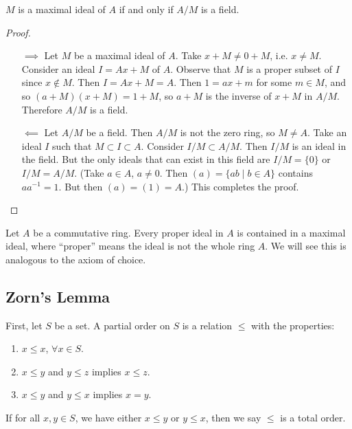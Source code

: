 \begin{prop}
$M$ is a maximal ideal of $A$ if and only if $A / M$ is a field.
\end{prop}

\begin{proof}
\begin{itemize}
  \item[$\implies$]
  {
    Let $M$ be a maximal ideal of $A$. Take $x + M \neq 0 + M$,
    i.e. $x \neq M$. Consider an ideal $I = A x + M$ of $A$. Observe
    that $M$ is a proper subset of $I$ since $x \notin M$. Then
    $I = Ax + M = A$. Then $1 = a x + m$ for some $m \in M$, and so
    $(a + M)(x + M) = 1 + M$, so $a + M$ is the inverse of $x + M$ in
    $A / M$. Therefore $A / M$ is a field.
  }
  \item[$\impliedby$]
  {
    Let $A / M$ be a field. Then $A / M$ is not the zero ring, so
    $M \neq A$. Take an ideal $I$ such that $M \subset I \subset
    A$. Consider $I / M \subset A / M$. Then $I / M$ is an ideal in
    the field. But the only ideals that can exist in this field
    are $I / M = \{ 0 \}$ or $I / M = A / M$. (Take $a \in A$,
    $a \neq 0$. Then $(a) = \{ ab \mid b \in A \}$ contains $a a^{-1}
    = 1$. But then $(a) = (1) = A$.) This completes the proof.
  }
\end{itemize}
\end{proof}

\begin{theorem}[?]
Let $A$ be a commutative ring. Every proper ideal in $A$ is contained
in a maximal ideal, where ``proper'' means the ideal is not the whole
ring $A$. We will see this is analogous to the axiom of choice.
\end{theorem}

\subsection{Zorn's Lemma}
First, let $S$ be a set. A partial order on $S$ is a relation $\leq$
with the properties:
\begin{enumerate}
\item{
  $x \leq x$, $\forall x \in S$.
}
\item{
  $x \leq y$ and $y \leq z$ implies $x \leq z$.
}
\item{
  $x \leq y$ and $y \leq x$ implies $x = y$.
}
\end{enumerate}

If for all $x, y \in S$, we have either $x \leq y$ or $y \leq x$, then
we say $\leq$ is a total order.


